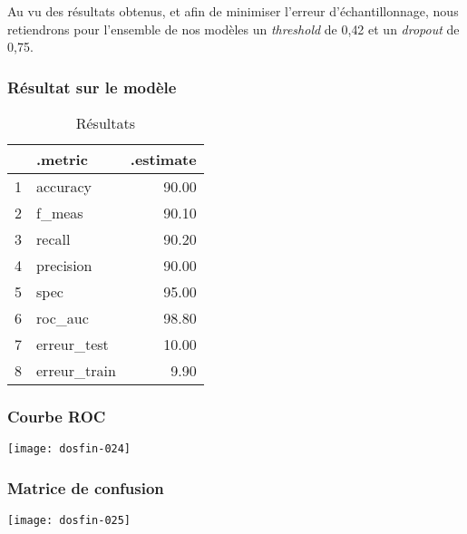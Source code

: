 \documentclass[a4paper,11pt]{article}
\begin{document}
Au vu des résultats obtenus, et afin de minimiser l'erreur d'échantillonnage, nous retiendrons pour l'ensemble de nos modèles un \textit{threshold} de 0{,}42 et un \textit{dropout} de 0{,}75.


\newpage
\subsubsection{Résultat sur le modèle}

\begin{center}



\begin{table}[ht]
\centering
\begin{tabular}{rlr}
  \hline
 & .metric & .estimate \\ 
  \hline
1 & accuracy & 90.00 \\ 
  2 & f\_meas & 90.10 \\ 
  3 & recall & 90.20 \\ 
  4 & precision & 90.00 \\ 
  5 & spec & 95.00 \\ 
  6 & roc\_auc & 98.80 \\ 
  7 & erreur\_test & 10.00 \\ 
  8 & erreur\_train & 9.90 \\ 
   \hline
\end{tabular}
\caption{Résultats} 
\end{table}
\end{center}


\subsubsection{Courbe ROC}

\begin{center}

\texttt{[image: dosfin-024]}

\end{center}

\newpage

\subsubsection{Matrice de confusion}

\begin{center}

\texttt{[image: dosfin-025]}

\end{center}
\end{document}
